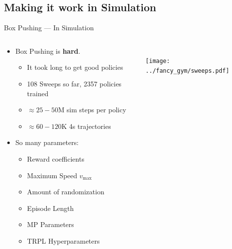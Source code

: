\documentclass[16:9,en,navbarinfooter]{sdqbeamer}
\begin{document}
\subsection{Making it work in Simulation}
\begin{frame}{Box Pushing --- In Simulation}

\begin{columns}[t]
    \begin{column}{0.4\textwidth}
        \vspace{1cm}
        \begin{itemize}
            \item Box Pushing is \textbf{hard}.
            \begin{itemize}
                \item It took long to get good policies
                \item 108 Sweeps so far, 2357 policies trained
                \item $\approx 25-50\text{M}$ sim steps per policy 
                \item $\approx 60-120\text{K}$ 4s trajectories
            \end{itemize}
            \item So many parameters:
            \begin{itemize}
                \item Reward coefficients
                \item Maximum Speed $v_{\max}$
                \item Amount of randomization
                \item Episode Length
                \item MP Parameters
                \item TRPL Hyperparameters
            \end{itemize}
        \end{itemize}
    \end{column}
    \begin{column}{0.5\textwidth}
        \vspace{.2cm} \\
        \center 
        \texttt{[image: ../fancy\_gym/sweeps.pdf]} \\

    \end{column}
\end{columns}
\end{frame}
\end{document}

